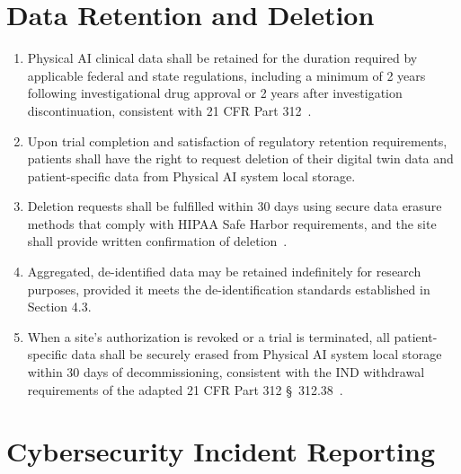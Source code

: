 \section{Data Retention and Deletion}

\begin{enumerate}[label=(\alph*)]
\item Physical AI clinical data shall be retained for the duration required by
  applicable federal and state regulations, including a minimum of 2 years
  following investigational drug approval or 2 years after investigation
  discontinuation, consistent with 21 CFR Part 312~\cite{cfr312adapt}.

\item Upon trial completion and satisfaction of regulatory retention
  requirements, patients shall have the right to request deletion of their
  digital twin data and patient-specific data from Physical AI system local
  storage.

\item Deletion requests shall be fulfilled within 30 days using secure data
  erasure methods that comply with HIPAA Safe Harbor requirements, and the
  site shall provide written confirmation of deletion~\cite{cfr312adapt}.

\item Aggregated, de-identified data may be retained indefinitely for research
  purposes, provided it meets the de-identification standards established in
  Section 4.3.

\item When a site's authorization is revoked or a trial is terminated, all
  patient-specific data shall be securely erased from Physical AI system local
  storage within 30 days of decommissioning, consistent with the IND
  withdrawal requirements of the adapted 21 CFR Part 312
  \S~312.38~\cite{cfr312adapt}.
\end{enumerate}

\section{Cybersecurity Incident Reporting}

